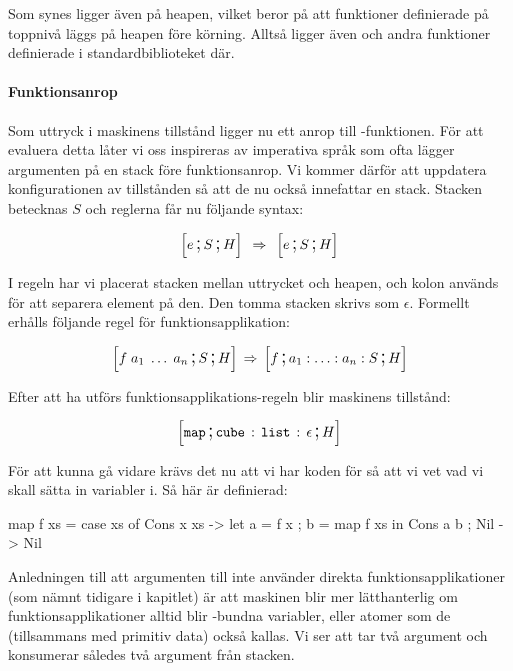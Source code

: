 \documentclass[../Core]{subfiles}
\begin{document}
Som synes ligger även   på heapen, vilket
beror på att funktioner definierade på toppnivå läggs på heapen före körning.
Alltså ligger även  och andra funktioner definierade
i standardbiblioteket där.

\paragraph{Funktionsanrop} Som uttryck i maskinens tillstånd ligger nu ett anrop till
-funktionen. %
För att evaluera detta låter vi oss inspireras av imperativa språk som ofta lägger argumenten
på en stack före funktionsanrop. Vi kommer därför att uppdatera konfigurationen av tillstånden så att de
nu också innefattar en stack. Stacken betecknas $S$ och reglerna får nu följande syntax:

\begin{equation*} 
\text{\large$$}\Big[e \,\text{\Large;}\, S \,\text{\Large;}\, H\Big] \; \,\Rightarrow\, \; \text{\large$$}\Big[e \,\text{\Large;}\, S \,\text{\Large;}\, H\Big]
\end{equation*} 

I regeln har vi placerat stacken mellan uttrycket och heapen, och kolon används
för att separera element på den. Den tomma stacken skrivs som $\epsilon$.
Formellt erhålls följande regel för funktionsapplikation:

\[
\text{\large$$}\Big[f\; a_{1}\;\ldots\; a_{n}\,\text{\Large;}\, S \,\text{\Large;}\, H\Big]\,\Rightarrow\, \text{\large$$}\Big[f\,\text{\Large;}\, a_{1}:\ldots:a_{n}:S\,\text{\Large;}\, H\Big]
\]


Efter att ha utförs funktionsapplikations-regeln blir maskinens tillstånd:

\[
\text{\large$$}\Big[\mathtt{map} \,\text{\Large;}\, \mathtt{cube} \,:\, \mathtt{list} \,:\, \epsilon \,\text{\Large;}\, H\Big]
\]

För att kunna gå vidare krävs det nu att vi har koden för  så att vi vet
vad vi skall sätta in variabler i. Så här är  definierad:


\begin{codeEx}
map f xs = case xs of
    { Cons x xs -> let { a = f x
                       ; b = map f xs
                       } in Cons a b
    ; Nil       -> Nil
    }
\end{codeEx}

Anledningen till att argumenten till  inte använder direkta funktionsapplikationer 
(som nämnt tidigare i kapitlet)
är att maskinen blir mer lätthanterlig om funktionsapplikationer alltid
blir -bundna variabler, eller atomer som de (tillsammans med primitiv data)
också kallas. Vi ser att  tar två argument och konsumerar således två
argument från stacken.
\end{document}
